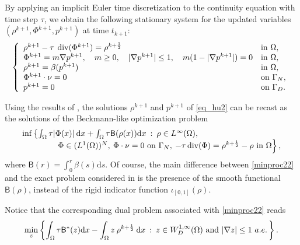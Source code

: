 \documentclass[final,reqno]{amsart}
\theoremstyle{plain}
\theoremstyle{definition}
\theoremstyle{remark}
\numberwithin{remark}{section}	%
\numberwithin{example}{section}	%
\DeclareMathOperator{\dive}{div}
\newcommand{\Om}{\Omega}
\newcommand{\pp}{a.e.\,}
\newcommand{\dd}{\mathrm{d}}
\newcommand{\BB}{\mathsf{B}}
\newcommand{\I}{\iota}
\begin{document}
By applying an implicit Euler time discretization to the continuity equation with time step $\tau$, we obtain the following stationary system for the updated variables $(\rho^{k+1}, \Phi^{k+1}, p^{k+1})$ at time $t_{k+1}$:
\begin{equation} \label{eq_hu2}
    \left\{
    \begin{array}{ll}
        \rho^{k+1} - \tau \:\dive(\Phi^{k+1}) = \rho^{k+\frac{1}{2}} & \hbox{in } \Omega,\\ 
        \Phi^{k+1} = m \nabla p^{k+1}, \quad m\geq0, \quad \vert \nabla p^{k+1}\vert \leq 1,\quad m(1-\vert \nabla p^{k+1}\vert)=0 & \hbox{in } \Omega,\\ 
        \rho^{k+1} = \beta(p^{k+1}) & \hbox{in } \Omega,\\ 
        \Phi^{k+1} \cdot \nu = 0 & \hbox{on } \Gamma_N,\\ 
        p^{k+1} = 0 & \hbox{on } \Gamma_D.
    \end{array}
    \right.
\end{equation}

Using the results of \cite{ennaji2023prediction}, the solutions $\rho^{k+1}$ and $p^{k+1}$ of \eqref{eq_hu2} can be recast as the solutions of the Beckmann-like optimization problem
\begin{equation}\label{minproc22}
    \begin{array}{l}
        \inf\left \{  \int_\Omega \tau \vert\Phi(x) \vert\: \dd x +  \int_{\Omega} \tau \BB(\rho(x))\dd x   \: :\: \rho \in L^\infty(\Omega), \right.  \\  
        \left. \hspace*{1.5cm}  \Phi\in (L^1(\Omega))^N,\: \Phi \cdot \nu=0 \hbox{ on } \Gamma_N,\:    -\tau\dive(\Phi) = \rho^{k+\frac{1}{2}} -\rho    \hbox{ in  }  \Omega \right\},
    \end{array}
\end{equation}
where $\BB(r) = \int_{0}^{r}\beta(s)\dd s$. Of course, the main difference between \eqref{minproc22} and the exact problem considered in \cite{ennaji2023prediction} is the presence of the smooth functional $\BB(\rho)$, instead of the rigid indicator function $\I_{[0,1]}(\rho)$.

Notice that the corresponding dual problem associated with \eqref{minproc22} reads
\begin{equation}\label{dual221}
    \min_{z}\left\{ \int_{\Om} \tau \BB^{*}(z)\dd x  - \int_\Om  z\:  \rho^{k+\frac{1}{2}} \: \dd x \: :\:  z\in W^{1,\infty}_{D}(\Omega)~\hbox{and}~\vert\nabla z \vert \leq 1~\pp\right\}.
\end{equation}
\end{document}

